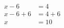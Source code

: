 \documentclass[varwidth]{standalone}
\begin{document}
    \begin{varwidth}{0.25\paperwidth}
    \begin{align*}
    x - 6 &= 4\\
    x - 6 + 6 &= 4 + 6\\
    x &= 10\\
\end{align*}
\end{varwidth}
\end{document}
